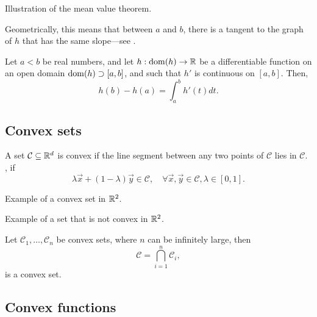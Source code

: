 \begin{marginfigure}
    \centering
    \caption{Illustration of the mean value theorem.}
    \label{fig:mean-value-theorem}
\end{marginfigure}

Geometrically, this means that between $a$ and $b$, there is a tangent to the graph of $h$ that has
the same slope---see .

\begin{theorem}
    Let $a<b$ be real numbers, and let $h: \mathrm{dom}(h) \to \mathbb{R}$ be a differentiable function on an open domain $\mathrm{dom}(h) \supset [a,b]$, and such that $h'$ is continuous on $[a,b]$. Then, \[
        h(b) - h(a) = \int_a^b h'(t)dt.
    \]
\end{theorem}

\subsection{Convex sets}

\begin{definition}
    A set $\mathcal{C}\subseteq \mathbb{R}^d$ is convex if the line segment between any two points of
    $\mathcal{C}$ lies in $\mathcal{C}$. \Ie, if \[
        \lambda \vec{x} + (1-\lambda)\vec{y} \in \mathcal{C}, \quad \forall \vec{x}, \vec{y} \in \mathcal{C}, \lambda \in [0,1].
    \]
\end{definition}

\begin{marginfigure}
    \centering
    \caption{Example of a convex set in $\mathbb{R}^2$.}
    \label{fig:convex-set-example}
\end{marginfigure}

\begin{marginfigure}
    \centering
    \caption{Example of a set that is not convex in $\mathbb{R}^2$.}
    \label{fig:non-convex-set-example}
\end{marginfigure}

\begin{lemma}
    Let $\mathcal{C}_1, \ldots, \mathcal{C}_n$ be convex sets, where $n$ can be infinitely large, then \[
        \mathcal{C} = \bigcap_{i=1}^n \mathcal{C}_i,
    \]
    is a convex set.
\end{lemma}

\subsection{Convex functions}

